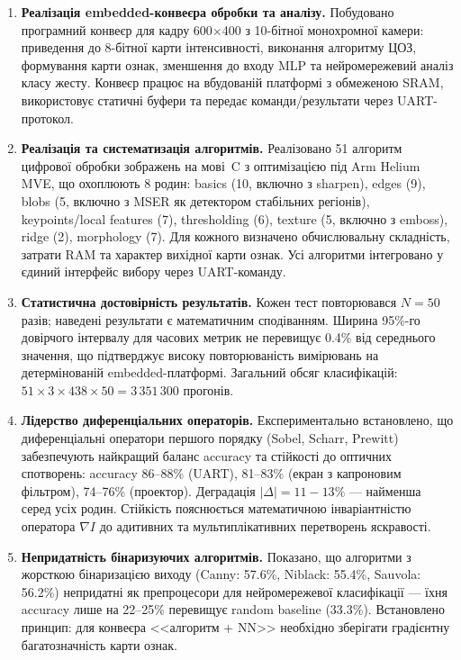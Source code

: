 \documentclass[a4paper,12pt]{article}
\begin{document}
\begin{enumerate}
	\item \textbf{Реалізація embedded-конвеєра обробки та аналізу.} Побудовано програмний конвеєр для кадру 600$\times$400 з 10-бітної монохромної камери: приведення до 8-бітної карти інтенсивності, виконання алгоритму ЦОЗ, формування карти ознак, зменшення до входу MLP та нейромережевий аналіз класу жесту. Конвеєр працює на вбудованій платформі з обмеженою SRAM, використовує статичні буфери та передає команди/результати через UART-протокол.

	\item \textbf{Реалізація та систематизація алгоритмів.} Реалізовано 51 алгоритм цифрової обробки зображень на мові~C з оптимізацією під Arm Helium MVE, що охоплюють 8 родин: basics (10, включно з sharpen), edges (9), blobs (5, включно з MSER як детектором стабільних регіонів), keypoints/local features (7), thresholding (6), texture (5, включно з emboss), ridge (2), morphology (7). Для кожного визначено обчислювальну складність, затрати RAM та характер вихідної карти ознак. Усі алгоритми інтегровано у єдиний інтерфейс вибору через UART-команду.

	\item \textbf{Статистична достовірність результатів.} Кожен тест повторювався $N=50$ разів; наведені результати є математичним сподіванням. Ширина 95\%-го довірчого інтервалу для часових метрик не перевищує 0.4\% від середнього значення, що підтверджує високу повторюваність вимірювань на детермінованій embedded-платформі. Загальний обсяг класифікацій: $51 \times 3 \times 438 \times 50 = 3\,351\,300$ прогонів.

	\item \textbf{Лідерство диференціальних операторів.} Експериментально встановлено, що диференціальні оператори першого порядку (Sobel, Scharr, Prewitt) забезпечують найкращий баланс accuracy та стійкості до оптичних спотворень: accuracy 86--88\% (UART), 81--83\% (екран з капроновим фільтром), 74--76\% (проектор). Деградація $|\Delta| = 11{-}13\%$ --- найменша серед усіх родин. Стійкість пояснюється математичною інваріантністю оператора $\nabla I$ до адитивних та мультиплікативних перетворень яскравості.

	\item \textbf{Непридатність бінаризуючих алгоритмів.} Показано, що алгоритми з жорсткою бінаризацією виходу (Canny: 57.6\%, Niblack: 55.4\%, Sauvola: 56.2\%) непридатні як препроцесори для нейромережевої класифікації --- їхня accuracy лише на 22--25\% перевищує random baseline (33.3\%). Встановлено принцип: для конвеєра <<алгоритм + NN>> необхідно зберігати градієнтну багатозначність карти ознак.


\end{enumerate}
\end{document}
